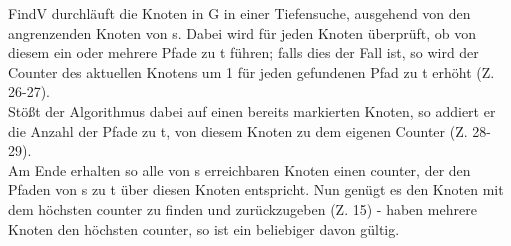 \documentclass[fleqn]{article}
\begin{document}
FindV durchläuft die Knoten in G in einer Tiefensuche, ausgehend von den angrenzenden Knoten von s. Dabei wird für jeden Knoten überprüft, ob von diesem ein oder mehrere Pfade zu t führen; falls dies der Fall ist, so wird der Counter des aktuellen Knotens um 1 für jeden gefundenen Pfad zu t erhöht (Z. 26-27). \\
Stößt der Algorithmus dabei auf einen bereits markierten Knoten, so addiert er die Anzahl der Pfade zu t, von diesem Knoten zu dem eigenen Counter (Z. 28-29).\\
Am Ende erhalten so alle von s erreichbaren Knoten einen counter, der den Pfaden von s zu t über diesen Knoten entspricht. Nun genügt es den Knoten mit dem höchsten counter zu finden und zurückzugeben (Z. 15) - haben mehrere Knoten den höchsten counter, so ist ein beliebiger davon gültig.
\end{document}
